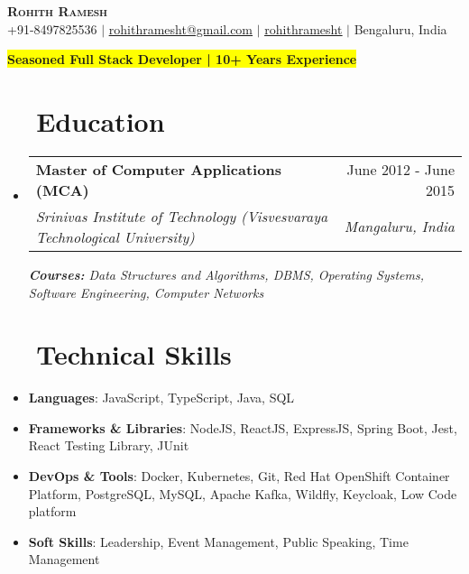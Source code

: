 \documentclass[a4paper,20pt]{article}
\makeatletter
\newcommand{\resumeItem}[2]{
	  \item\small{
	    \textbf{#1}{: #2 \vspace{-2pt}}
	  }
	}
\newcommand{\resumeSubheading}[4]{
	  \vspace{-1pt}\item
	    \begin{tabular*}{0.97\textwidth}{l@{\extracolsep{\fill}}r}
	      \textbf{#1} & #2 \\
	      \textit{#3} & \textit{#4} \\
	    \end{tabular*}\vspace{-5pt}
	}
\newcommand{\resumeSubItem}[2]{\resumeItem{#1}{#2}\vspace{-3pt}}
\newcommand{\resumeSubHeadingListStart}{\begin{itemize}[leftmargin=*]}
\newcommand{\resumeSubHeadingListEnd}{\end{itemize}}
\makeatother
\begin{document}
	
	\begin{center}
	    \textbf{\Huge \scshape Rohith Ramesh} \\ \vspace{1pt}
	    \small \faPhone{ }+91-8497825536 $|$ \faEnvelope{ }\href{mailto:rohithramesht@gmail.com}{\underline{rohithramesht@gmail.com}} $|$ 
	    \faLinkedin{ }\href{https://linkedin.com/in/rohithramesht/}{\underline{rohithramesht}} $|$ \faMapMarker{ }Bengaluru, India
	\end{center}
		\vspace{-10pt}

\begin{center}
\bfseries\colorbox{yellow}{Seasoned Full Stack Developer | 10+ Years Experience}
\end{center}

	\section{~~Education}
	  \resumeSubHeadingListStart
	    \resumeSubheading
	      {Master of Computer Applications (MCA)}{June 2012 - June 2015}
	      {Srinivas Institute of Technology (Visvesvaraya Technological University)}{\faMapMarker Mangaluru, India}
	      {\scriptsize \textit{ \footnotesize{\newline{}\textbf{Courses:} Data Structures and Algorithms, DBMS, Operating Systems, Software Engineering, Computer Networks}}}
	    \resumeSubHeadingListEnd
		    
	\vspace{-9pt}
	\section{~~Technical Skills}
		\resumeSubHeadingListStart
		\resumeSubItem{Languages}{JavaScript, TypeScript, Java, SQL}
		\resumeSubItem{Frameworks \& Libraries}{NodeJS, ReactJS, ExpressJS, Spring Boot, Jest, React Testing Library, JUnit}
		\resumeSubItem{DevOps \& Tools}{Docker, Kubernetes, Git, Red Hat OpenShift Container Platform, PostgreSQL, MySQL, Apache Kafka, Wildfly, Keycloak, Low Code platform}
		\resumeSubItem{Soft Skills}{Leadership, Event Management, Public Speaking, Time Management}
	
	\resumeSubHeadingListEnd
	\vspace{-5pt}
\end{document}
